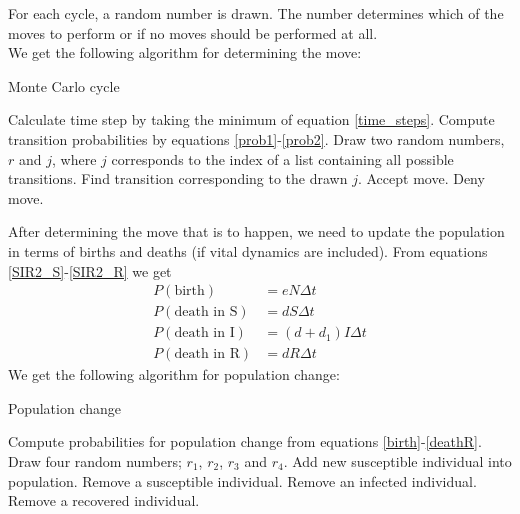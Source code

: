\documentclass[notitlepage, reprint, nofootinbib]{revtex4-1}
\begin{document}
For each cycle, a random number is drawn. The number determines which of the moves to perform or if no moves should be performed at all.\\[2mm] 
We get the following algorithm for determining the move: 
\begin{algorithm}[H]
	\caption{Monte Carlo cycle}
	\begin{algorithmic}[1]
		\State Calculate time step by taking the minimum of equation \ref{time_steps}.
		\State Compute transition probabilities by equations \ref{prob1}-\ref{prob2}.
		\State Draw two random numbers, $r$ and $j$, where $j$ corresponds to the index of a list containing all possible transitions.
		\State Find transition corresponding to the drawn $j$.
			\State Accept move. 
		\Else
			\State Deny move.
		\EndIf
	\end{algorithmic}
\end{algorithm}
After determining the move that is to happen, we need to update the population in terms of births and deaths (if vital dynamics are included). From equations \ref{SIR2_S}-\ref{SIR2_R} we get 
\begin{align}
	P(\text{birth})&=eN\Delta t\label{birth}\\
	P(\text{death in S}) &= dS\Delta t \\
	P(\text{death in I}) &= (d+d_1)I\Delta t\\
	P(\text{death in R}) &= dR\Delta t\label{deathR}
\end{align}
We get the following algorithm for population change:
\begin{algorithm}[H]
	\caption{Population change}
	\begin{algorithmic}[1]
		\State Compute probabilities for population change from equations \ref{birth}-\ref{deathR}.
		\State Draw four random numbers; $r_1$, $r_2$, $r_3$ and $r_4$.
			\State Add new susceptible individual into population. 
			\State Remove a susceptible individual. 
			\State Remove an infected individual.
			\State Remove a recovered individual.
		\EndIf
	\end{algorithmic}
\end{algorithm}
\end{document}
